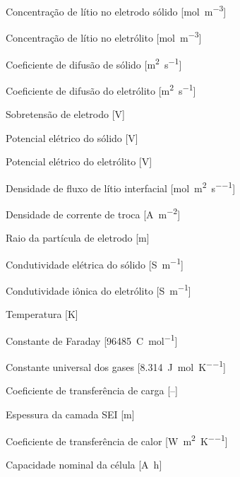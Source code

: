 \documentclass[
    12pt,
    openright,
    twoside,
    a4paper,
    brazil,
    english
]{abntex2}
\begin{document}
\begin{simbolos}
  \item[$c_s$]  Concentração de lítio no eletrodo sólido [\si{\mol\per\meter\cubed}]
  \item[$c_e$]  Concentração de lítio no eletrólito [\si{\mol\per\meter\cubed}]
  \item[$D_s$]  Coeficiente de difusão de sólido [\si{\meter\squared\per\second}]
  \item[$D_e$]  Coeficiente de difusão do eletrólito [\si{\meter\squared\per\second}]
  \item[$\eta$]  Sobretensão de eletrodo [V]
  \item[$\phi_s$]  Potencial elétrico do sólido [V]
  \item[$\phi_e$]  Potencial elétrico do eletrólito [V]
  \item[$j$]    Densidade de fluxo de lítio interfacial [\si{\mol\per\meter\squared\per\second}]
  \item[$j_0$]  Densidade de corrente de troca [\si{\ampere\per\meter\squared}]
  \item[$R_s$]  Raio da partícula de eletrodo [\si{\meter}]
  \item[$\sigma_s$]  Condutividade elétrica do sólido [\si{\siemens\per\meter}]
  \item[$\kappa$]  Condutividade iônica do eletrólito [\si{\siemens\per\meter}]
  \item[$T$]    Temperatura [K]
  \item[$F$]    Constante de Faraday [\SI{96485}{\coulomb\per\mol}]
  \item[$R$]    Constante universal dos gases [\SI{8.314}{\joule\per\mol\per\kelvin}]
  \item[$\alpha$]  Coeficiente de transferência de carga [--]
  \item[$\delta_{SEI}$]  Espessura da camada SEI [\si{\meter}]
  \item[$h$]    Coeficiente de transferência de calor [\si{\watt\per\meter\squared\per\kelvin}]
  \item[$Q_{cap}$]  Capacidade nominal da célula [\si{\ampere\hour}]
\end{simbolos}

\tableofcontents*
\cleardoublepage

\textual
\end{document}

